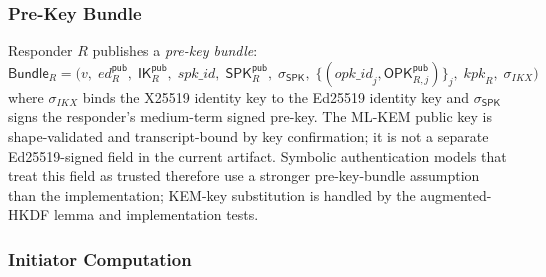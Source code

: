 \documentclass[11pt,a4paper]{article}
\theoremstyle{definition}
\theoremstyle{remark}
\newcommand{\IK}{\mathsf{IK}}
\newcommand{\SPK}{\mathsf{SPK}}
\newcommand{\OPK}{\mathsf{OPK}}
\begin{document}
\subsubsection{Pre-Key Bundle}

Responder $R$ publishes a \emph{pre-key bundle}:
\[
  \mathsf{Bundle}_R = \bigl(v,\; ed_R^{\mathsf{pub}},\;
    \IK_R^{\mathsf{pub}},\; \mathit{spk\_id},\;
    \SPK_R^{\mathsf{pub}},\; \sigma_{\SPK},\;
    \{(\mathit{opk\_id}_j,\OPK_{R,j}^{\mathsf{pub}})\}_{j},\;
    \mathit{kpk}_R,\; \sigma_{\mathit{IKX}}\bigr)
\]
where $\sigma_{\mathit{IKX}}$ binds the X25519 identity key to the Ed25519 identity key
and $\sigma_{\SPK}$ signs the responder's medium-term signed pre-key. The
ML-KEM public key is shape-validated and transcript-bound by key confirmation;
it is not a separate Ed25519-signed field in the current artifact. Symbolic
authentication models that treat this field as trusted therefore use a stronger
pre-key-bundle assumption than the implementation; KEM-key substitution is
handled by the augmented-HKDF lemma and implementation tests.

\subsubsection{Initiator Computation}
\end{document}

